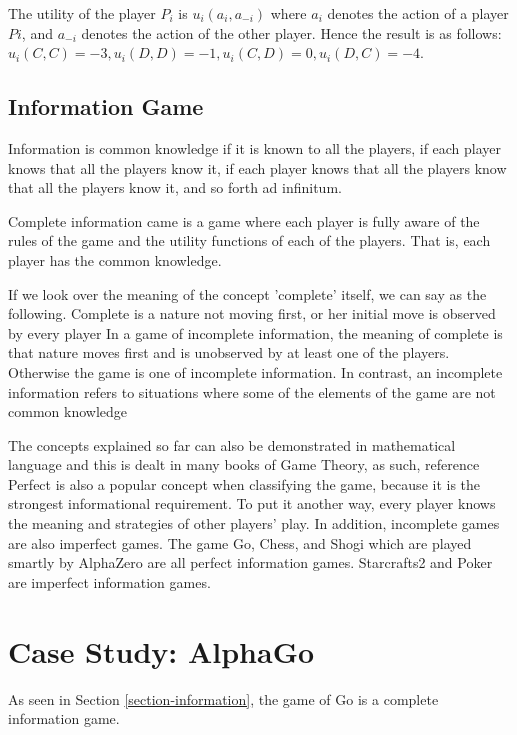 \documentclass[11pt]{article}
\begin{document}
	The utility of the player $P_i$ is $u_i(a_i, a_{-i})$ where $a_i$ denotes the action of a player $Pi$, and $a_{-i}$ denotes the action of the other player. Hence the result is as follows: 
	$u_i(C,C)=-3, u_i(D,D)=-1, u_i(C,D)=0, u_i(D,C)=-4$.


	\subsection{Information Game}
	Information is common knowledge if it is known to all the players, if each player knows that all the players know it, if each player knows that all the players know that all the players know it, and so forth ad infinitum.


	Complete information came is a game where each player is fully aware of the rules of the game and the utility functions of each of the players. 
	That is, each player has the common knowledge.
	
	
	If we look over the meaning of the concept 'complete' itself, we can say as the following. Complete is a nature not moving first, or her initial move is observed by every player
	In a game of incomplete information, the meaning of complete is that nature moves first and is unobserved by at least one of the players. Otherwise the game is one of incomplete information.
	In contrast, an incomplete information refers to situations where some of the elements of the game are not common knowledge
	
	
	
	The concepts explained so far can also be demonstrated in mathematical language and this is dealt in many books of Game Theory, as such, reference~~%
	Perfect is also a popular concept when classifying the game, because it is the strongest informational requirement. To put it another way, every player knows the meaning and strategies of other players' play. In addition, incomplete games are also imperfect games. The game Go, Chess, and Shogi which are played smartly by AlphaZero are all perfect information games. Starcrafts2 and Poker are imperfect information games.
	
	\section{Case Study: AlphaGo}\label{section-alphago}
	As seen in Section \ref{section-information}, the game of Go is a complete information game.
	
\end{document}
